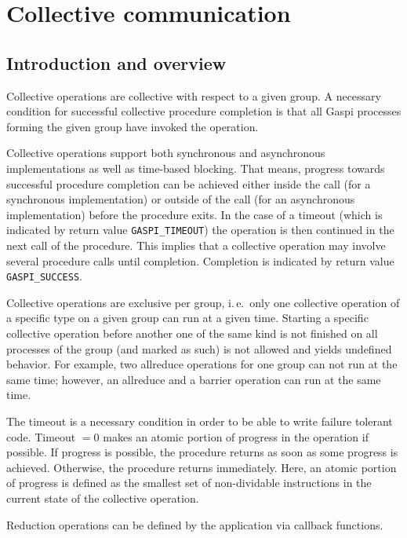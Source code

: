 \documentclass[a4paper]{article}
\newlength{\st}\setlength{\st}{0pt}
\newcommand{\zsep}[1]{#1}
\newcommand{\GASPI}{{\sc Gaspi}}
\newcommand{\GASPISUCC}{{\tt\protect\zsep{GASPI\_SUCCESS}}}
\newcommand{\GASPITIME}{{\tt\protect\zsep{GASPI\_TIMEOUT}}}
\begin{document}
\section{Collective communication}
\label{sec:collectives}

\subsection{Introduction and overview}

Collective operations are collective with respect to a given group.
A necessary condition for successful collective procedure completion is that all
\GASPI{} processes forming the given group have invoked the operation.

Collective operations support both synchronous and asynchronous implementations as
well as time-based blocking. That means, progress towards successful procedure
completion can be achieved either inside the call (for a synchronous implementation)
or outside of the call (for an asynchronous implementation) before the procedure exits.
In the case of a timeout (which is indicated
by return value \GASPITIME{}) the operation is then continued in the
next call of the procedure. This implies that a collective operation
may involve several procedure calls until completion. Completion is
indicated by return value \GASPISUCC{}.

Collective operations are exclusive per group, i.\,e.\ only one collective
operation of a specific type on a given group can run at a given time. Starting a
specific collective operation before another one of the same kind is not
finished on all processes of the group
(and marked as such) is not allowed and yields undefined behavior.
For example, two allreduce operations for one group can not run at the same time; however,
an allreduce and a barrier operation can run at the same time.

The timeout is a necessary condition in order to be able to write
failure tolerant code. Timeout $=0$ makes an atomic portion of
progress in the operation if possible. If progress is possible, the
procedure returns as soon as some progress is
achieved. Otherwise, the procedure returns immediately. Here, an
atomic portion of progress is defined as the smallest set of
non-dividable instructions in the current state of the collective
operation.

Reduction operations can be defined by the application via callback
functions.
\end{document}
